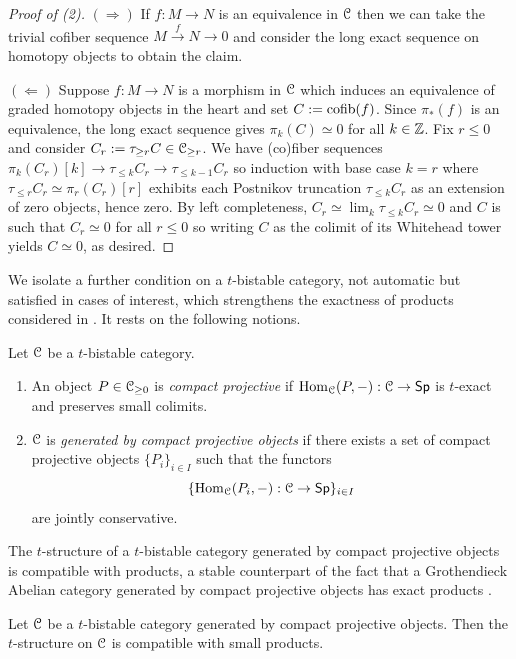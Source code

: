 \begin{proof}[Proof of (2)]
    $(\Rightarrow)$ If $f:M\to N$ is an equivalence in $\EuScript{C}$ then we can take the trivial cofiber sequence $M\xrightarrow{f}N\to0$ and consider the long exact sequence on homotopy objects to obtain the claim. 

    $(\Leftarrow)$ Suppose $f:M\to N$ is a morphism in $\EuScript{C}$ which induces an equivalence of graded homotopy objects in the heart and set $C:=\mathrm{cofib}(f)$. Since $\pi_{*}(f)$ is an equivalence, the long exact sequence gives $\pi_{k}(C)\simeq0$ for all $k\in\mathbb{Z}$. Fix $r\leq0$ and consider $C_{r}:=\tau_{\geq r}C\in\EuScript{C}_{\geq r}$. We have (co)fiber sequences $\pi_{k}(C_{r})[k]\to\tau_{\leq k}C_{r}\to\tau_{\leq k-1}C_{r}$ so induction with base case $k=r$ where $\tau_{\leq r}C_{r}\simeq\pi_{r}(C_{r})[r]$ exhibits each Postnikov truncation $\tau_{\leq k}C_{r}$ as an extension of zero objects, hence zero. By left completeness, $C_{r}\simeq\lim_{k}\tau_{\leq k}C_{r}\simeq0$ and $C$ is such that $C_{r}\simeq0$ for all $r\leq0$ so writing $C$ as the colimit of its Whitehead tower yields $C\simeq0$, as desired. 
\end{proof}
We isolate a further condition on a $t$-bistable category, not automatic but satisfied in cases of interest, which strengthens the exactness of products considered in . It rests on the following notions.
\begin{definition}\label{def: compact projective objects}
    Let $\EuScript{C}$ be a $t$-bistable category. 
    \begin{enumerate}
        \item An object $P\in\EuScript{C}_{\geq0}$ is \emph{compact projective} if $\mathrm{Hom}_{\EuScript{C}}(P,-):\EuScript{C}\to\mathsf{Sp}$ is $t$-exact and preserves small colimits. 
        \item $\EuScript{C}$ is \emph{generated by compact projective objects} if there exists a set of compact projective objects $\{P_{i}\}_{i\in I}$ such that the functors 
        $$\{\mathrm{Hom}_{\EuScript{C}}(P_{i},-):\EuScript{C}\to\mathsf{Sp}\}_{i\in I}$$ 
        are jointly conservative.
    \end{enumerate}
\end{definition}
The $t$-structure of a $t$-bistable category generated by compact projective objects is compatible with products, a stable counterpart of the fact that a Grothendieck Abelian category generated by compact projective objects has exact products \cite[Lem. A.3.15]{NeemanTriangulated}. 
\begin{proposition}\label{prop: compact projectively generated implies product compatibility}
    Let $\EuScript{C}$ be a $t$-bistable category generated by compact projective objects. Then the $t$-structure on $\EuScript{C}$ is compatible with small products. 
\end{proposition}
